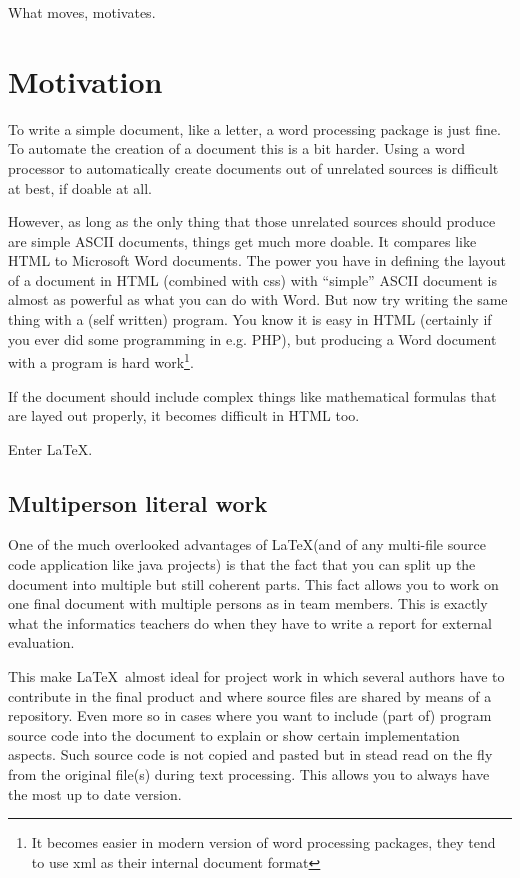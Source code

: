 \renewcommand\TheFile{ch02_motivates.tex}

\begin{savequote}[15cm]
  \raggedleft
  \sffamily
  What moves, motivates.
\end{savequote}
\chapter{Motivation}
To write a simple document, like a letter, a word processing package 
is just fine.
To automate the creation of a document this is a bit harder. 
Using a word processor to automatically create documents out of 
unrelated sources is difficult at best, if doable at all.

However, as long as the only thing that those unrelated sources should
produce are simple ASCII documents, things get much more
doable. It compares like HTML to Microsoft Word documents. The power
you have in defining the layout of a document in HTML (combined with
css) with ``simple'' ASCII document is almost as powerful as what you
can do with Word. But now try writing the same thing with a (self
written) program. You know it is easy in HTML (certainly if you ever
did some programming in e.g. PHP), but producing a Word document with
a program is hard work\footnote{It becomes easier in modern version of
word processing packages, they tend to use xml as their internal document format}. 

If the document should include complex things like mathematical
formulas that are layed out properly, it becomes difficult in HTML too.

Enter \LaTeX.

\section{Multiperson literal work}
One of the much overlooked advantages of \LaTeX (and of any multi-file
source code application like java projects) is that the fact that you
can split up the document into multiple but still coherent parts.
This fact allows you to work on one final document with multiple
persons as in team members. This is exactly what the informatics teachers do when they have
to write a report for external evaluation.

This make \LaTeX\ almost ideal for project work in which several
authors have to contribute in the final product and where source files
are shared by means of a repository. Even more so in
cases where you want to include (part of) program source code
into the document to explain or show certain implementation
aspects. Such source code is not copied and pasted but in stead read
on the fly from the original file(s) during text processing. This
allows you to always have the most up to date version.


